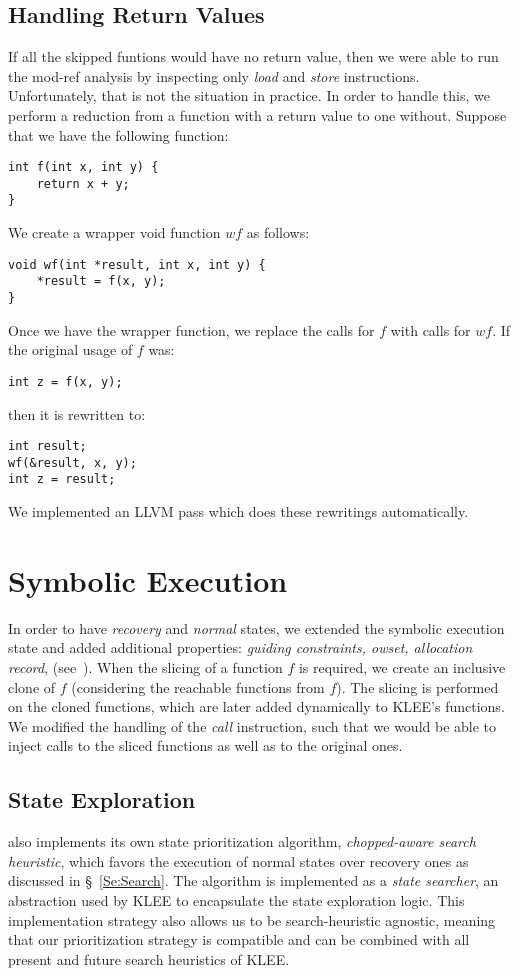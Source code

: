 \subsection{Handling Return Values}
If all the skipped funtions would have no return value,
then we were able to run the mod-ref analysis by inspecting only \textit{load} and \textit{store} instructions.
Unfortunately, that is not the situation in practice.
In order to handle this, we perform a reduction from a function with a return value to one without.
Suppose that we have the following function:
\begin{lstlisting}[linewidth=.4\textwidth,numbers=none]
int f(int x, int y) {
    return x + y;
}
\end{lstlisting}
\label{fig:ret2void-original}
We create a wrapper void function $wf$ as follows:
\begin{lstlisting}[linewidth=.4\textwidth,numbers=none]
void wf(int *result, int x, int y) {
    *result = f(x, y);
}
\end{lstlisting}
\label{fig:ret2void-original}
Once we have the wrapper function, we replace the calls for $f$ with calls for $wf$.
If the original usage of $f$ was:
\begin{lstlisting}[linewidth=.4\textwidth,numbers=none]
int z = f(x, y);
\end{lstlisting}
then it is rewritten to:
\begin{lstlisting}[linewidth=.4\textwidth,numbers=none]
int result;
wf(&result, x, y);
int z = result;
\end{lstlisting}
We implemented an LLVM pass which does these rewritings automatically.

\section{Symbolic Execution}
In order to have \textit{recovery} and \textit{normal} states,
we extended the symbolic execution state
and added additional properties: \textit{guiding constraints, owset, allocation record}, \etc (see~).
When the slicing of a function $f$ is required,
we create an inclusive clone of $f$ (considering the reachable functions from $f$).
The slicing is performed on the cloned functions, which are later added dynamically to KLEE's functions.
We modified the handling of the \textit{call} instruction,
such that we would be able to inject calls to the sliced functions as well as to the original ones.


\subsection{State Exploration}
\toolname also implements its own state
prioritization algorithm, \textit{chopped-aware search heuristic},
which favors the execution of normal states over recovery ones as
discussed in \S~\ref{Se:Search}. The algorithm is implemented as a
\textit{state searcher}, an abstraction used by KLEE to encapsulate
the state exploration logic. This implementation strategy also allows
us to be search-heuristic agnostic, meaning that our prioritization
strategy is compatible and can be combined with all present and future
search heuristics of KLEE.

